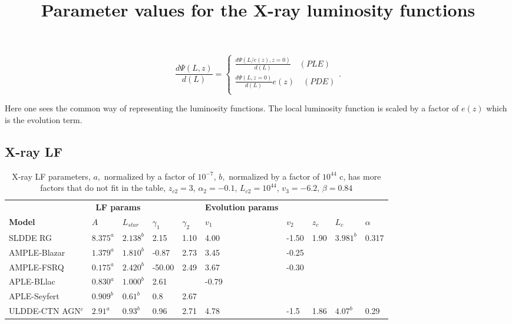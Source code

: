 \begin{equation}\frac{d\Psi(L,z)}{d(L)} = 
    \begin{cases}
        \frac{d\Psi(L/e(z),z=0)}{d(L)} \quad (PLE)\\
        \frac{d\Psi(L,z=0)}{d(L)}e(z) \quad (PDE)\\
    \end{cases}
    .
\end{equation}

Here one sees the common way of representing the luminosity functions. The local luminosity function is scaled by a factor of $e(z)$ which is the evolution term.
\subsection{X-ray LF}

\begin{table}
    \centering
    \title{Parameter values for the X-ray luminosity functions}
    \begin{tabularx}{\textwidth}{|l|XXXX|XXXXX|}
        \hline

        & \multicolumn{2}{c}{\textbf{LF params}} &&&  \textbf{Evolution params} &&&&\\

        \textbf{Model} & $A$ & $L_{star}$ & $\gamma _1$ &  $\gamma _2$  & $v_1$ & $v_2$ & $z_c$ & $L_c$ & $ \alpha$\\
        \hline
        SLDDE RG & $8.375^a$ & $2.138^b$ & 2.15 & 1.10 & 4.00 & -1.50 & 1.90 & $3.981^b$ & 0.317  \\

        AMPLE-Blazar & $1.379^a$ & $1.810^b$ & -0.87 & 2.73 & 3.45 & -0.25 & & &  \\

        AMPLE-FSRQ & $0.175^a$ & $2.420^b$ & -50.00 & 2.49 & 3.67 & -0.30 & & &  \\

        APLE-BLlac & $0.830^a$& $1.000^b$ & 2.61 & &-0.79& & & &  \\
        APLE-Seyfert & $0.909^b$ & $0.61^b$ & 0.8 & 2.67& & & & &  \\
        ULDDE-CTN AGN$^c$ & $2.91^a$ & $0.93^b$ & 0.96 & 2.71& 4.78 &-1.5 &1.86 &$4.07^b$ &0.29  \\
        \hline
    \end{tabularx}
    \caption{X-ray LF parameters, $a,$ normalized by a factor of $10^{-7}$, $b,$ normalized by a factor of $10^{44}$
    c, has more factors that do not fit in the table, $z_{c2} = 3$, $\alpha_2 =-0.1$, $L_{c2} = 10^{44}$, $v_3 = -6.2 $, $\beta=0.84$ }
    \label{tab:xray_lf}
\end{table}

